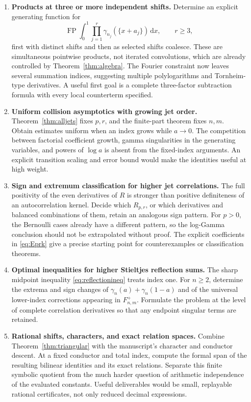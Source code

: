 \documentclass[11pt]{article}
\numberwithin{equation}{section}
\theoremstyle{definition}\newtheorem{definition}[theorem]{Definition}
\theoremstyle{remark}\newtheorem{remark}[theorem]{Remark}
\DeclareMathOperator{\FP}{FP}
\newcommand{\dd}{\,\mathrm d}
\begin{document}
\begin{enumerate}[leftmargin=*,label=\textbf{\arabic*.},itemsep=7pt]
\item \textbf{Products at three or more independent shifts.}
Determine an explicit generating function for
\[
 \FP\int_0^1\prod_{j=1}^r\gamma_{n_j}(\{x+a_j\})\dd x,
 \qquad r\ge3,
\]
first with distinct shifts and then as selected shifts coalesce.
These are simultaneous pointwise products, not iterated convolutions,
which are already controlled by Theorem~\ref{thm:algebra}.
The Fourier constraint now leaves several summation indices, suggesting
multiple polylogarithms and Tornheim-type derivatives. A useful first
goal is a complete three-factor subtraction formula with every local
counterterm specified.

\item \textbf{Uniform collision asymptotics with growing jet order.}
Theorem~\ref{thm:alljets} fixes $p,r$, and the finite-part theorem fixes
$n,m$. Obtain estimates uniform when an index grows while $a\to0$.
The competition between factorial coefficient growth, gamma singularities
in the generating variables, and powers of $\log a$ is absent from the
fixed-index arguments. An explicit transition scaling and error bound
would make the identities useful at high weight.

\item \textbf{Sign and extremum classification for higher jet correlations.}
The full positivity of the even derivatives of $R$ is stronger than
positive definiteness of an autocorrelation kernel. Decide which
$R_{p,r}$, or which derivatives and balanced combinations of them,
retain an analogous sign pattern. For $p>0$, the Bernoulli cases already
have a different pattern, so the log-Gamma conclusion should not be
extrapolated without proof. The explicit coefficients in
\eqref{eq:Eprk} give a precise starting point for counterexamples or
classification theorems.

\item \textbf{Optimal inequalities for higher Stieltjes reflection sums.}
The sharp midpoint inequality \eqref{eq:reflectionineq} treats index one.
For $n\ge2$, determine the extrema and sign changes of
$\gamma_n(a)+\gamma_n(1-a)$ and of the universal lower-index corrections
appearing in $F^+_{n,m}$. Formulate the problem at the level of complete
correlation derivatives so that any endpoint singular terms are retained.

\item \textbf{Rational shifts, characters, and exact relation spaces.}
Combine Theorem~\ref{thm:triangular} with the manuscript's character and
conductor descent. At a fixed conductor and total index, compute the
formal span of the resulting bilinear identities and its exact
relations. Separate this finite symbolic quotient from the much harder
question of arithmetic independence of the evaluated constants.
Useful deliverables would be small, replayable rational certificates,
not only reduced decimal expressions.


\end{enumerate}
\end{document}
